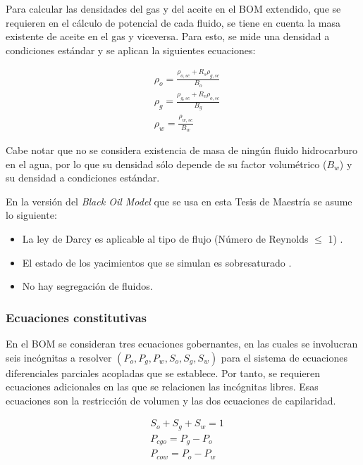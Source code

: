 Para calcular las densidades del gas y del aceite en el BOM extendido, que se requieren en el cálculo de potencial de cada fluido, se tiene en cuenta la masa existente de aceite en el gas y viceversa. Para esto, se mide una densidad a condiciones estándar y se aplican la siguientes ecuaciones:

\begin{align}
	\label{ec:oildensity}&\rho_{o} = \frac{\rho_{o,sc} + R_{s}\rho_{g,sc}}{B_{o}}\\
	\label{ec:gasdensity}&\rho_{g} = \frac{\rho_{g,sc} + R_{v}\rho_{o,sc}}{B_{g}}\\
	\label{ec:watdensity}&\rho_{w} = \frac{\rho_{w,sc}}{B_{w}}
\end{align}

Cabe notar que no se considera existencia de masa de ningún fluido hidrocarburo en el agua, por lo que su densidad sólo depende de su factor volumétrico ($B_{w}$) y su densidad a condiciones estándar.

En la versión del \textit{Black Oil Model} que se usa en esta Tesis de Maestría se asume lo siguiente:
\begin{itemize}
	\item La ley de Darcy es aplicable al tipo de flujo (Número de Reynolds $\le$ 1) \citep{takhanov2011forchheimer}.
	\item El estado de los yacimientos que se simulan es sobresaturado \citep{chen2007reservoir}.
	\item No hay segregación de fluidos.
\end{itemize}

\subsubsection{Ecuaciones constitutivas}

En el BOM se consideran tres ecuaciones gobernantes, en las cuales se involucran seis incógnitas a resolver $\left(P_{o}, P_{g}, P_{w}, S_{o}, S_{g}, S_{w}\right)$ para el sistema de ecuaciones diferenciales parciales acopladas que se establece. Por tanto, se requieren ecuaciones adicionales en las que se relacionen las incógnitas libres. Esas ecuaciones son la restricción de volumen y las dos ecuaciones de capilaridad.

\begin{align}
	\label{ec:volumeRes}&S_{o}+S_{g}+S_{w} = 1\\
	\label{ec:CapillaryGas}&P_{cgo} = P_{g} - P_{o}\\
	\label{ec:CapillaryWater}&P_{cow} = P_{o} - P_{w}
\end{align}

